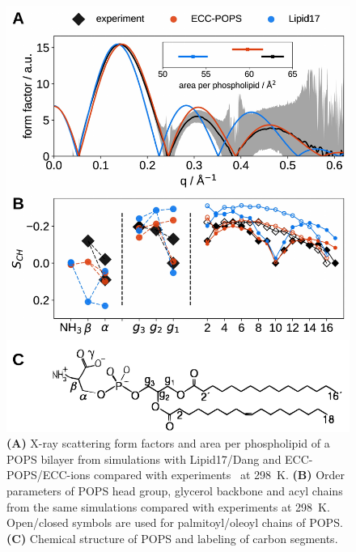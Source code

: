 \documentclass[journal=jpcbfk,manuscript=article]{achemso}
\newlength{\figwidth}
\begin{document}
\begin{figure}[tb!] 
  \centering 
  \includegraphics[width=\figwidth]{../img/formF_OPs_APLinset_POPSchemfig.pdf} 
\hfill
  \caption{\label{simVSexpNOions_POPS} 
    \textbf{(A)} X-ray scattering form factors and area per phospholipid of a POPS bilayer
    from simulations with Lipid17/Dang \citep{lipid17-future, dang2006} and 
    ECC-POPS/ECC-ions \cite{martinek17, Pluhackova2016} compared with experiments~\citep{kucerka14} at 298~K. 
    \textbf{(B)} Order parameters of POPS head group, glycerol backbone and acyl chains  
    from the same simulations 
    compared with experiments at 298~K. \citep{NMRlipidsIV}
    Open/closed symbols are used for palmitoyl/oleoyl chains of POPS. 
    \textbf{(C)} Chemical structure of POPS and labeling of carbon segments. 
  }  
\end{figure} 
\end{document}
